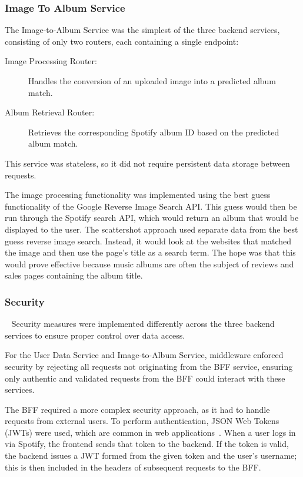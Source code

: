 \subsubsection{Image To Album Service}
The Image-to-Album Service was the simplest of the three backend services, consisting of only two routers, each containing a single endpoint:

\begin{description}
    \item[Image Processing Router:] Handles the conversion of an uploaded image into a predicted album match.
    \item[Album Retrieval Router:] Retrieves the corresponding Spotify album ID based on the predicted album match.
\end{description}

This service was stateless, so it did not require persistent data storage between requests.

The image processing functionality was implemented using the best guess functionality of the Google Reverse Image Search API. This guess would then be run through the Spotify search API, which would return an album that would be displayed to the user. The scattershot approach used separate data from the best guess reverse image search. Instead, it would look at the websites that matched the image and then use the page's title as a search term. The hope was that this would prove effective because music albums are often the subject of reviews and sales pages containing the album title.

\subsubsection{Security}~\label{sec:backend-security}
Security measures were implemented differently across the three backend services to ensure proper control over data access.

For the User Data Service and Image-to-Album Service, middleware enforced security by rejecting all requests not originating from the BFF service, ensuring only authentic and validated requests from the BFF could interact with these services.

The BFF required a more complex security approach, as it had to handle requests from external users. To perform authentication, JSON Web Tokens (JWTs) were used, which are common in web applications~\cite{9320801}. When a user logs in via Spotify, the frontend sends that token to the backend. If the token is valid, the backend issues a JWT formed from the given token and the user's username; this is then included in the headers of subsequent requests to the BFF.

